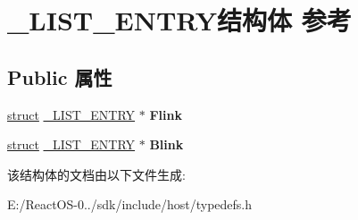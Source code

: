 \hypertarget{struct___l_i_s_t___e_n_t_r_y}{}\section{\+\_\+\+L\+I\+S\+T\+\_\+\+E\+N\+T\+R\+Y结构体 参考}
\label{struct___l_i_s_t___e_n_t_r_y}
\subsection*{Public 属性}
\begin{DoxyCompactItemize}
\item 
\mbox{\label{struct___l_i_s_t___e_n_t_r_y_a4d67c5f973e82b7aa25c74f3a3ca4e30}} 
\hyperlink{interfacestruct}{struct} \hyperlink{struct___l_i_s_t___e_n_t_r_y}{\+\_\+\+L\+I\+S\+T\+\_\+\+E\+N\+T\+RY} $\ast$ {\bfseries Flink}
\item 
\mbox{\label{struct___l_i_s_t___e_n_t_r_y_a3a60644cad17d7dd53f6b7b378b191f3}} 
\hyperlink{interfacestruct}{struct} \hyperlink{struct___l_i_s_t___e_n_t_r_y}{\+\_\+\+L\+I\+S\+T\+\_\+\+E\+N\+T\+RY} $\ast$ {\bfseries Blink}
\end{DoxyCompactItemize}


该结构体的文档由以下文件生成\+:\begin{DoxyCompactItemize}
\item 
E\+:/\+React\+O\+S-\/0../sdk/include/host/typedefs.\+h\end{DoxyCompactItemize}
